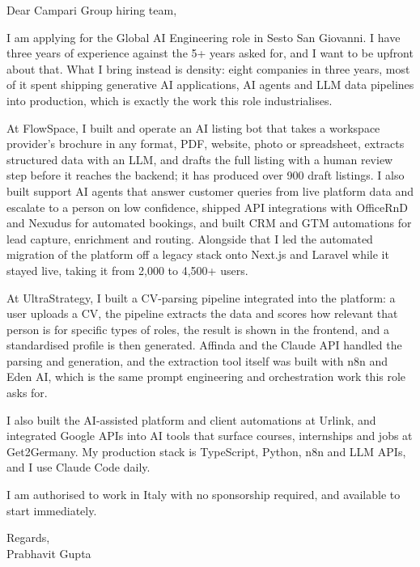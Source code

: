 \documentclass[a4paper,11pt]{article}
\begin{document}
Dear Campari Group hiring team,

I am applying for the Global AI Engineering role in Sesto San Giovanni. I have three years of experience against the 5+ years asked for, and I want to be upfront about that. What I bring instead is density: eight companies in three years, most of it spent shipping generative AI applications, AI agents and LLM data pipelines into production, which is exactly the work this role industrialises.

At FlowSpace, I built and operate an AI listing bot that takes a workspace provider's brochure in any format, PDF, website, photo or spreadsheet, extracts structured data with an LLM, and drafts the full listing with a human review step before it reaches the backend; it has produced over 900 draft listings. I also built support AI agents that answer customer queries from live platform data and escalate to a person on low confidence, shipped API integrations with OfficeRnD and Nexudus for automated bookings, and built CRM and GTM automations for lead capture, enrichment and routing. Alongside that I led the automated migration of the platform off a legacy stack onto Next.js and Laravel while it stayed live, taking it from 2,000 to 4,500+ users.

At UltraStrategy, I built a CV-parsing pipeline integrated into the platform: a user uploads a CV, the pipeline extracts the data and scores how relevant that person is for specific types of roles, the result is shown in the frontend, and a standardised profile is then generated. Affinda and the Claude API handled the parsing and generation, and the extraction tool itself was built with n8n and Eden AI, which is the same prompt engineering and orchestration work this role asks for.

I also built the AI-assisted platform and client automations at Urlink, and integrated Google APIs into AI tools that surface courses, internships and jobs at Get2Germany. My production stack is TypeScript, Python, n8n and LLM APIs, and I use Claude Code daily.

I am authorised to work in Italy with no sponsorship required, and available to start immediately.

Regards,\\
Prabhavit Gupta
\end{document}
